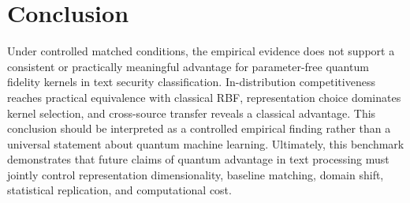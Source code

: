 \documentclass[10pt,twocolumn,letterpaper]{article}
\begin{document}
\section{Conclusion}
\label{sec:concl}
Under controlled matched conditions, the empirical evidence does not support a consistent or practically meaningful advantage for parameter-free quantum fidelity kernels in text security classification. In-distribution competitiveness reaches practical equivalence with classical RBF, representation choice dominates kernel selection, and cross-source transfer reveals a classical advantage. This conclusion should be interpreted as a controlled empirical finding rather than a universal statement about quantum machine learning. Ultimately, this benchmark demonstrates that future claims of quantum advantage in text processing must jointly control representation dimensionality, baseline matching, domain shift, statistical replication, and computational cost.



\end{document}
